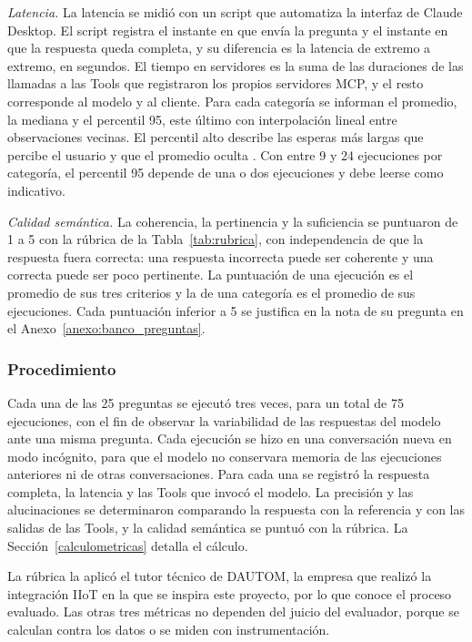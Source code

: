 \textit{Latencia.} La latencia se midió con un script que automatiza la interfaz de Claude Desktop. El script registra el instante en que envía la pregunta y el instante en que la respuesta queda completa, y su diferencia es la latencia de extremo a extremo, en segundos. El tiempo en servidores es la suma de las duraciones de las llamadas a las Tools que registraron los propios servidores MCP, y el resto corresponde al modelo y al cliente. Para cada categoría se informan el promedio, la mediana y el percentil 95, este último con interpolación lineal entre observaciones vecinas. El percentil alto describe las esperas más largas que percibe el usuario y que el promedio oculta \cite{Dean2013Tail}. Con entre 9 y 24 ejecuciones por categoría, el percentil 95 depende de una o dos ejecuciones y debe leerse como indicativo.

\textit{Calidad semántica.} La coherencia, la pertinencia y la suficiencia se puntuaron de 1 a 5 con la rúbrica de la Tabla~\ref{tab:rubrica}, con independencia de que la respuesta fuera correcta: una respuesta incorrecta puede ser coherente y una correcta puede ser poco pertinente. La puntuación de una ejecución es el promedio de sus tres criterios y la de una categoría es el promedio de sus ejecuciones. Cada puntuación inferior a 5 se justifica en la nota de su pregunta en el Anexo~\ref{anexo:banco_preguntas}.

\subsubsection{Procedimiento}

Cada una de las 25 preguntas se ejecutó tres veces, para un total de 75 ejecuciones, con el fin de observar la variabilidad de las respuestas del modelo ante una misma pregunta. Cada ejecución se hizo en una conversación nueva en modo incógnito, para que el modelo no conservara memoria de las ejecuciones anteriores ni de otras conversaciones. Para cada una se registró la respuesta completa, la latencia y las Tools que invocó el modelo. La precisión y las alucinaciones se determinaron comparando la respuesta con la referencia y con las salidas de las Tools, y la calidad semántica se puntuó con la rúbrica. La Sección~\ref{calculometricas} detalla el cálculo.

La rúbrica la aplicó el tutor técnico de DAUTOM, la empresa que realizó la integración IIoT en la que se inspira este proyecto, por lo que conoce el proceso evaluado. Las otras tres métricas no dependen del juicio del evaluador, porque se calculan contra los datos o se miden con instrumentación.

